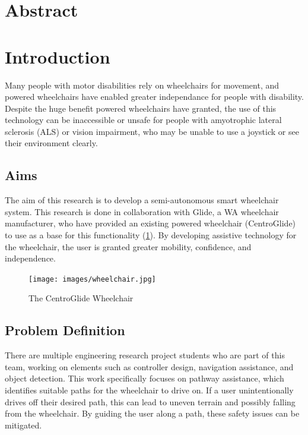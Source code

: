 \documentclass[12pt]{article}
\begin{document}

\thispagestyle{empty}
\pagebreak

\section*{Abstract}
\pagebreak

\renewcommand{\contentsname}{Table of Contents}
\tableofcontents
\pagebreak
\listoffigures
\listoftables
\pagebreak





\section{Introduction}
Many people with motor disabilities rely on wheelchairs for movement, and
powered wheelchairs have enabled greater independance for people with disability.
Despite the huge benefit powered wheelchairs have granted,
the use of this technology can be inaccessible or unsafe for people
with amyotrophic lateral sclerosis (ALS) or vision impairment,
who may be unable to use a joystick or see their environment clearly.


\subsection{Aims}
The aim of this research is to develop a semi-autonomous smart wheelchair system.
This research is done in collaboration with Glide, a WA wheelchair manufacturer,
who have provided an existing powered wheelchair (CentroGlide) to use as a base
for this functionality (\cref{fig:wheelchair}). By developing assistive technology for the wheelchair,
the user is granted greater mobility, confidence, and independence.

\begin{figure}[H]
    \centering
    \texttt{[image: images/wheelchair.jpg]}
    \caption{The CentroGlide Wheelchair}
    \label{fig:wheelchair}
\end{figure}

\pagebreak
\subsection{Problem Definition}
There are multiple engineering research project students who are part of this team,
working on elements such as controller design, navigation assistance, and object detection.
This work specifically focuses on pathway assistance, which identifies suitable
paths for the wheelchair to drive on. If a user unintentionally drives off their desired path,
this can lead to uneven terrain and possibly falling from the wheelchair.
By guiding the user along a path, these safety issues can be mitigated.
\end{document}
